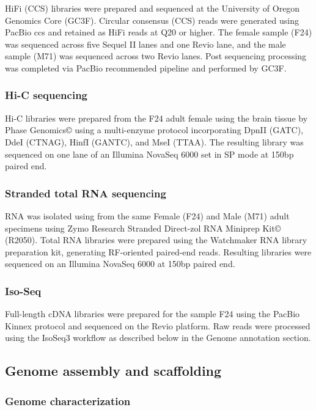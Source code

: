 \documentclass[11pt]{article}
\begin{document}
HiFi (CCS) libraries were prepared and sequenced at the University of Oregon Genomics Core (GC3F). Circular consensus (CCS) reads were generated using PacBio ccs and retained as HiFi reads at Q20 or higher. The female sample (F24) was sequenced across five Sequel II lanes and one Revio lane, and the male sample (M71) was sequenced across two Revio lanes. Post sequencing processing was completed via PacBio recommended pipeline and performed by GC3F.

\subsubsection{Hi-C sequencing}

Hi-C libraries were prepared from the F24 adult female using the brain tissue by Phase Genomics© using a multi-enzyme protocol incorporating DpnII (GATC), DdeI (CTNAG), HinfI (GANTC), and MseI (TTAA). The resulting library was sequenced on one lane of an Illumina NovaSeq 6000 set in SP mode at 150bp paired end.

\subsubsection{Stranded total RNA sequencing }
 
RNA was isolated using from the same Female (F24) and Male (M71) adult specimens using Zymo Research Stranded Direct-zol RNA Miniprep Kit© (R2050). Total RNA libraries were prepared using the Watchmaker RNA library preparation kit, generating RF-oriented paired-end reads. Resulting libraries were sequenced on an Illumina NovaSeq 6000 at 150bp paired end.

\subsubsection{Iso-Seq}

Full-length cDNA libraries were prepared for the sample F24 using the PacBio Kinnex protocol and sequenced on the Revio platform. Raw reads were processed using the IsoSeq3 workflow as described below in the Genome annotation section.

\subsection{Genome assembly and scaffolding}

\subsubsection{Genome characterization}
\end{document}
